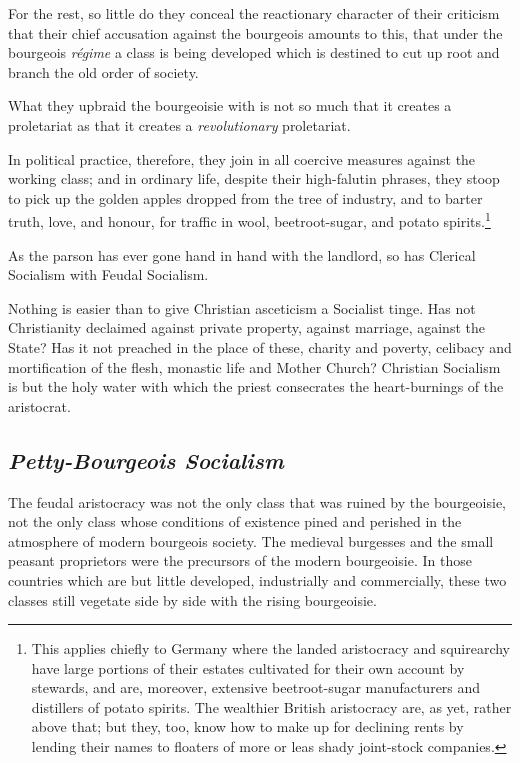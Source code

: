 For the rest, so little do they conceal the reactionary character of their criticism that their chief accusation against the bourgeois amounts to this, that under the bourgeois \emph{régime} a class is being developed which is destined to cut up root and branch the old order of society. 

What they upbraid the bourgeoisie with is not so much that it creates a proletariat as that it creates a \emph{revolutionary} proletariat. 

In political practice, therefore, they join in all coercive measures against the working class; and in ordinary life, despite their high-falutin phrases, they stoop to pick up the golden apples dropped from the tree of industry, and to barter truth, love, and honour, for traffic in wool, beetroot-sugar, and potato spirits.\footnote{This applies chiefly to Germany where the landed aristocracy and squirearchy have large portions of their estates cultivated for their own account by stewards, and are, moreover, extensive beetroot-sugar manufacturers and distillers of potato spirits. The wealthier British aristocracy are, as yet, rather above that; but they, too, know how to make up for declining rents by lending their names to floaters of more or leas shady joint-stock companies.}

As the parson has ever gone hand in hand with the landlord, so has Clerical Socialism with Feudal Socialism. 

Nothing is easier than to give Christian asceticism a Socialist tinge. Has not Christianity declaimed against private property, against marriage, against the State? Has it not preached in the place of these, charity and poverty, celibacy and mortification of the flesh, monastic life and Mother Church? Christian Socialism is but the holy water with which the priest consecrates the heart-burnings of the aristocrat. 

\subsection{\itshape Petty-Bourgeois Socialism}

The feudal aristocracy was not the only class that was ruined by the bourgeoisie, not the only class whose conditions of existence pined and perished in the atmosphere of modern bourgeois society. The medieval burgesses and the small peasant proprietors were the precursors of the modern bourgeoisie. In those countries which are but little developed, industrially and commercially, these two classes still vegetate side by side with the rising bourgeoisie. 

